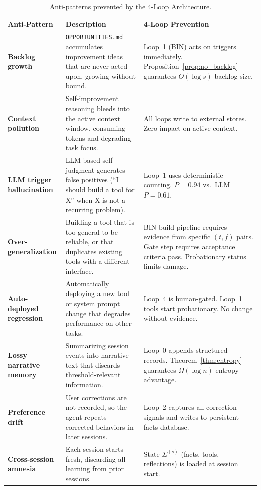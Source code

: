 \documentclass[11pt]{article}
\begin{document}
\begin{table}[H]
\centering
\caption{Anti-patterns prevented by the 4-Loop Architecture.}
\label{tab:antipatterns}
\begin{tabularx}{\textwidth}{lXX}
\toprule
Anti-Pattern & Description & 4-Loop Prevention \\
\midrule
\textbf{Backlog growth} &
\texttt{OPPORTUNITIES.md} accumulates improvement ideas that are never
acted upon, growing without bound. &
Loop~1 (BIN) acts on triggers immediately. Proposition~\ref{prop:no_backlog}
guarantees $O(\log s)$ backlog size. \\[6pt]

\textbf{Context pollution} &
Self-improvement reasoning bleeds into the active context window, consuming
tokens and degrading task focus. &
All loops write to external stores. Zero impact on active context. \\[6pt]

\textbf{LLM trigger hallucination} &
LLM-based self-judgment generates false positives (``I should build a tool
for X'' when X is not a recurring problem). &
Loop~1 uses deterministic counting. $P = 0.94$ vs.\ LLM $P = 0.61$. \\[6pt]

\textbf{Over-generalization} &
Building a tool that is too general to be reliable, or that duplicates
existing tools with a different interface. &
BIN build pipeline requires evidence from specific $(t,f)$ pairs.
Gate step requires acceptance criteria pass. Probationary status limits damage. \\[6pt]

\textbf{Auto-deployed regression} &
Automatically deploying a new tool or system prompt change that degrades
performance on other tasks. &
Loop~4 is human-gated. Loop~1 tools start probationary. No change without evidence. \\[6pt]

\textbf{Lossy narrative memory} &
Summarizing session events into narrative text that discards threshold-relevant
information. &
Loop~0 appends structured records. Theorem~\ref{thm:entropy} guarantees
$\Omega(\log n)$ entropy advantage. \\[6pt]

\textbf{Preference drift} &
User corrections are not recorded, so the agent repeats corrected behaviors
in later sessions. &
Loop~2 captures all correction signals and writes to persistent facts database. \\[6pt]

\textbf{Cross-session amnesia} &
Each session starts fresh, discarding all learning from prior sessions. &
State $\Sigma^{(s)}$ (facts, tools, reflections) is loaded at session start. \\[6pt]


\end{tabularx}
\end{table}
\end{document}
